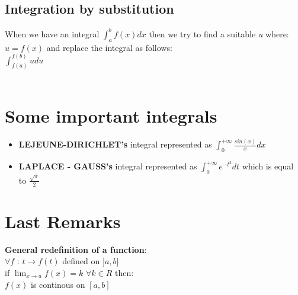 \documentclass{article}
\begin{document}
\subsection{Integration by substitution}
When we have an integral $\int_{a}^{b} f(x) dx$ then we try to find a suitable \textit{u} where:\\
$u = f(x)$ and replace the integral as follows:\\
$\int_{f(a)}^{f(b)} u du $\\
\\
\section{Some important integrals}
\begin{itemize}
    \item \textbf{LEJEUNE-DIRICHLET's} integral represented as $\int_{0}^{+\infty} \frac{sin(x)}{x} dx$
    \item \textbf{LAPLACE - GAUSS's} integral represented as $\int_{0}^{+\infty} e^{-t^{2}} dt$ which is equal to $\frac{\sqrt{\pi}}{2}$
\end{itemize}
\section{Last Remarks}
\textbf{General redefinition of a function}: \\
$\forall f$ : $t \rightarrow f(t)$ defined on $] a, b ]$\\
if $\lim_{x \to a} f(x) = k$ $\forall k \in R$ then:\\
$f(x)$ is continous on $[ a, b ]$
\end{document}
